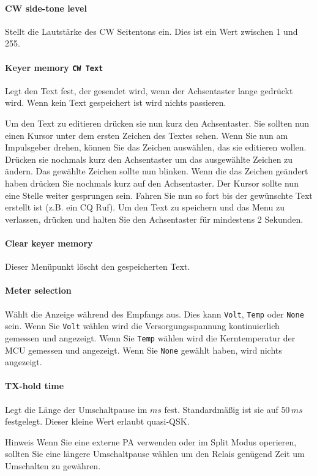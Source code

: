 \documentclass[10pt, a4paper,twoside]{scrartcl}
\newenvironment{remark}{\begin{bclogo}[couleur=blue!30,arrondi=.1,logo=\bcinfo,ombre=true]{Hinweis}}{\end{bclogo}}
\begin{document}
\paragraph{CW side-tone level}
Stellt die Lautstärke des CW Seitentons ein. Dies ist ein Wert zwischen 1 und 255.

\paragraph{Keyer memory \texttt{CW Text}}
Legt den Text fest, der gesendet wird, wenn der Achsentaster lange gedrückt wird. Wenn kein Text gespeichert ist wird nichts passieren.

Um den Text zu editieren drücken sie nun kurz den Achsentaster. Sie sollten nun einen Kursor unter dem ersten Zeichen des Textes sehen. Wenn Sie nun am Impulsgeber drehen, können Sie das Zeichen auswählen, das sie editieren wollen. Drücken sie nochmals kurz den Achsentaster um das ausgewählte Zeichen zu ändern. Das gewählte Zeichen sollte nun blinken. Wenn die das Zeichen geändert haben drücken Sie nochmals kurz auf den Achsentaster. Der Kursor sollte nun eine Stelle weiter gesprungen sein. Fahren Sie nun so fort bis der gewünschte Text erstellt ist (z.B. ein CQ Ruf). Um den Text zu speichern und das Menu zu verlassen, drücken und halten Sie den Achsentaster für mindestens 2 Sekunden.

\paragraph{Clear keyer memory}
Dieser Menüpunkt löscht den gespeicherten Text.

\paragraph{Meter selection}
Wählt die Anzeige während des Empfangs aus. Dies kann \texttt{Volt}, \texttt{Temp} oder \texttt{None} sein. Wenn Sie \texttt{Volt} wählen wird die Versorgungsspannung kontinuierlich gemessen und angezeigt. Wenn Sie \texttt{Temp} wählen wird die Kerntemperatur der MCU gemessen und angezeigt. Wenn Sie \texttt{None} gewählt haben, wird nichts angezeigt.

\paragraph{TX-hold time}
Legt die Länge der Umschaltpause im $ms$ fest. Standardmäßig ist sie auf $50\,ms$ festgelegt. Dieser kleine Wert erlaubt quasi-QSK. 
\begin{remark}
Wenn Sie eine externe PA verwenden oder im Split Modus operieren, sollten Sie eine längere Umschaltpause wählen um den Relais genügend Zeit um Umschalten zu gewähren.
\end{remark}
\end{document}
